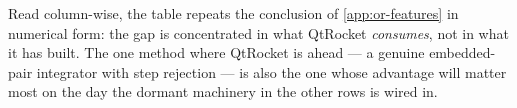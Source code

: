 Read column-wise, the table repeats the conclusion of \cref{app:or-features} in numerical
form: the gap is concentrated in what QtRocket \emph{consumes}, not in what it has built.
The one method where QtRocket is ahead --- a genuine embedded-pair integrator with step
rejection --- is also the one whose advantage will matter most on the day the dormant
machinery in the other rows is wired in.
